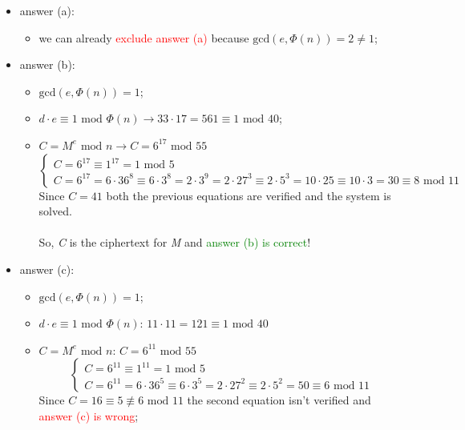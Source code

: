 \documentclass[11pt, a4paper]{article}
\newcommand{\mymod}{
    \text{ mod }
}
\begin{document}
\begin{itemize}
    \item answer (a):
    \begin{itemize}
        \item we can already \textcolor{red}{exclude answer (a)} because $\text{gcd}(e,\Phi(n))=2\ne1$;
    \end{itemize}
    \item answer (b):
    \begin{itemize}
        \item $\text{gcd}(e,\Phi(n))=1$; \checkmark
        \item $d\cdot e\equiv1\mymod\Phi(n) \longrightarrow 33\cdot17=561\equiv1\mymod40$; \checkmark
        \item $C=M^e\mymod n \longrightarrow C=6^{17}\mymod55$
        \begin{equation*}
            \begin{cases}
                C=6^{17}\equiv1^{17}=1\mymod5\\
                C=6^{17}=6\cdot36^8\equiv6\cdot3^8=2\cdot3^9=2\cdot27^3\equiv2\cdot5^3=10\cdot25\equiv10\cdot3=30\equiv8\mymod11
            \end{cases}
        \end{equation*}
        Since $C=41$ both the previous equations are verified and the system is solved. \checkmark\\\\
        So, \textit{C} is the ciphertext for \textit{M} and \textcolor{Green}{answer (b) is correct}!
    \end{itemize}
    \item answer (c):
    \begin{itemize}
        \item $\text{gcd}(e,\Phi(n))=1$; \checkmark
        \item $d\cdot e\equiv1\mymod\Phi(n)$: $11\cdot11=121\equiv1\mymod40$ \checkmark
        \item $C=M^e\mymod n$: $C=6^{11}\mymod55$
        \begin{equation*}
            \begin{cases}
                C=6^{11}\equiv1^{11}=1\mymod5\\
                C=6^{11}=6\cdot36^5\equiv6\cdot3^5=2\cdot27^2\equiv2\cdot5^2=50\equiv6\mymod11
            \end{cases}
        \end{equation*}
        Since $C=16\equiv5\not\equiv6\mymod11$ the second equation isn't verified and \textcolor{red}{answer (c) is wrong};
    \end{itemize}
\end{itemize}
\end{document}
